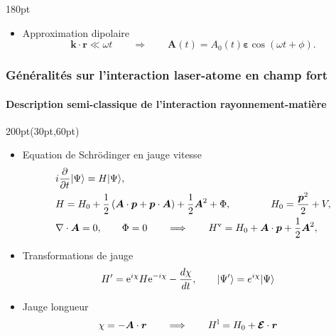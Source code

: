 \begin{frame}
\begin{textblock*}{180pt}
\begin{itemize}
\item Approximation dipolaire
\begin{equation*}
  \boldsymbol{k}\cdot\boldsymbol{r} \ll \omega t \qquad \Longrightarrow \qquad 
\boldsymbol{A}(t) = A_0(t)\boldsymbol{\varepsilon}
 \cos (\omega t + \phi).
\end{equation*}

\end{itemize}

\end{textblock*}



\end{frame}

\begin{frame}
\frametitle{G\'en\'eralit\'es sur l'interaction laser-atome en champ fort}
\framesubtitle{Description semi-classique de l'interaction rayonnement-mati\`ere}


\begin{textblock*}{200pt}(30pt,60pt)
\footnotesize
\begin{itemize}
\item Equation de Schr\"odinger en jauge vitesse
\begin{align*}
 &    i\frac{\partial}{\partial t} |\Psi\rangle
     =  H|\Psi\rangle, \\
& H = H_0
 + \frac{1}{2}\left(\boldsymbol{A}\cdot\boldsymbol{p}
  + \boldsymbol{p}\cdot\boldsymbol{A}\right)
   + \frac{1}{2}\boldsymbol{A}^2 +\Phi, \qquad\qquad 
H_0 = \frac{\boldsymbol{p}^2}{2} + V, \\
&\nabla\cdot\boldsymbol{A}=0, \qquad\Phi=0 \qquad\Longrightarrow\qquad
 H^{\rm v} = H_0
 + \boldsymbol{A}\cdot\boldsymbol{p}
   + \frac{1}{2}\boldsymbol{A}^2, 
\end{align*}
\item Transformations de jauge
\begin{align*}
& H^\prime  = {\rm e}^{i\chi} H {\rm e}^{-i\chi}
 - \frac{d\chi}{dt}, \qquad |\Psi^\prime\rangle = e^{i\chi}|\Psi\rangle
\end{align*}
\item Jauge longueur
\begin{align*}
& \chi = -\boldsymbol{A}\cdot\boldsymbol{r} \qquad\Longrightarrow\qquad
  H^{\rm l} = H_0 + \boldsymbol{\mathcal{E}}\cdot\boldsymbol{r}
\end{align*}
\end{itemize}


\end{textblock*}
\end{frame}
